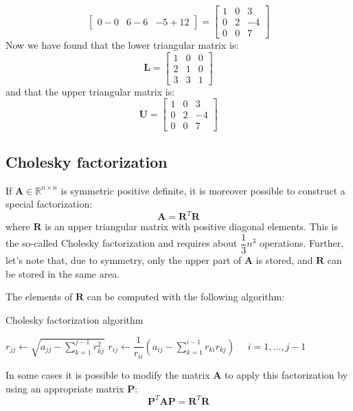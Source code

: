 \documentclass[12pt, a4paper]{report}
\newtheorem[style=M,bodystyle=\normalfont]{theorem}{Theorem}
\newtheorem[style=M,bodystyle=\normalfont]{proposition}{Proposition}
\newtheorem[style=M,bodystyle=\normalfont]{corollary}{Corollary}
\newtheorem[style=M,bodystyle=\normalfont]{lemma}{Lemma}
\newtheorem[style=M,bodystyle=\normalfont]{definition}{Definition}
\begin{document}
\begin{example}
\[\begin{bmatrix}
            0-0 & 6-6 & -5+12
        \end{bmatrix}=
        \begin{bmatrix}
            1 & 0 & 3 \\
            0 & 2 & -4 \\
            0 & 0 & 7
        \end{bmatrix}\]
        Now we have found that the lower triangular matrix is: 
        \[\boldsymbol{L}=
        \begin{bmatrix}
            1 & 0 & 0 \\
            2 & 1 & 0 \\
            3 & 3 & 1
        \end{bmatrix}\]
        and that the upper triangular matrix is: 
        \[\boldsymbol{U}=
        \begin{bmatrix}
            1 & 0 & 3 \\
            0 & 2 & -4 \\
            0 & 0 & 7
        \end{bmatrix}\]
    \end{example}

    \subsection{Cholesky factorization}
    If $\boldsymbol{A} \in \mathbb{R}^{n \times n}$ is symmetric positive definite, it is moreover possible to construct a special factorization: 
    \[\boldsymbol{A}=\boldsymbol{R}^T\boldsymbol{R}\]
    where $\boldsymbol{R}$ is an upper triangular matrix with positive diagonal elements. This is the so-called Cholesky factorization and requires about $\dfrac{1}{3}n^3$
    operations. Further, let's note that, due to symmetry, only the upper part of $\boldsymbol{A}$ is stored, and $\boldsymbol{R}$ can be stored in the same area. 

    The elements of $\boldsymbol{R}$ can be computed with the following algorithm: 
    \begin{algorithm}[H]
        \caption{Cholesky factorization algorithm}
            \begin{algorithmic}
                \State $r_{jj}\leftarrow\sqrt{a_{jj}-\sum_{k=1}^{j-1}r_{kj}^2}$
                \State $r_{ij}\leftarrow\dfrac{1}{r_{ii}}\left(a_{ij}-\sum_{k=1}^{i-1}r_{ki}r_{kj}\right) \:\:\:\:\:\: i = 1,\dots,j-1$
            \end{algorithmic}
    \end{algorithm}
    In some cases it is possible to modify the matrix $\boldsymbol{A}$ to apply this factorization by using an appropriate matrix $\boldsymbol{P}$: 
    \[\boldsymbol{P}^T\boldsymbol{AP}=\boldsymbol{R}^T\boldsymbol{R}\]
\end{document}
